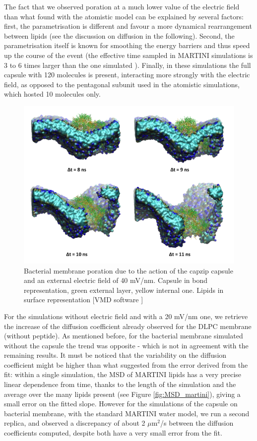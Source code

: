 The fact that we observed poration at a much lower value of the electric field than what found with the atomistic model can be explained by several factors: first, the parametrisation is different and favour a more dynamical rearrangement between lipids (see the discussion on diffusion in the following). Second, the parametrisation itself is known for smoothing the energy barriers and thus speed up the course of the event (the effective time sampled in MARTINI simulations is 3 to 6 times larger than the one simulated \citep{SiewertJ.Marrink2003}). Finally, in these simulations the full capsule with 120 molecules is present, interacting more strongly with the electric field, as opposed to the pentagonal subunit used in the atomistic simulations, which hosted 10 molecules only.

\begin{figure}[t!]
\centering\includegraphics[width=0.95\linewidth]{3results_capsule/pics/poration_martini.png} 
\caption[MARTINI simulations of capsule on membrane]{Bacterial membrane poration due to the action of the capzip capsule and an external electric field of 40 mV/nm. Capsule in bond representation, green external layer, yellow internal one. Lipids in surface representation [VMD software \citet{HUMP96}]}
\label{fig:martini_poration}
\end{figure}

For the simulations without electric field and with a 20 mV/nm one, we retrieve the increase of the diffusion coefficient already observed for the DLPC membrane (without peptide). As mentioned before, for the bacterial membrane simulated without the capsule the trend was opposite - which is not in agreement with the remaining results.
%
It must be noticed that the variability on the diffusion coefficient might be higher than what suggested from the error derived from the fit: within a single simulation, the MSD of MARTINI lipids has a very precise linear dependence from time, thanks to the length of the simulation and the average over the many lipids present (see Figure \ref{fig:MSD_martini}), giving a small error on the fitted slope. However for the simulations of the capsule on bacterial membrane, with the standard MARTINI water model, we run a second replica, and observed a discrepancy of about 2 $\mu$m$^2$/s between the diffusion coefficients computed, despite both have a very small error from the fit.


